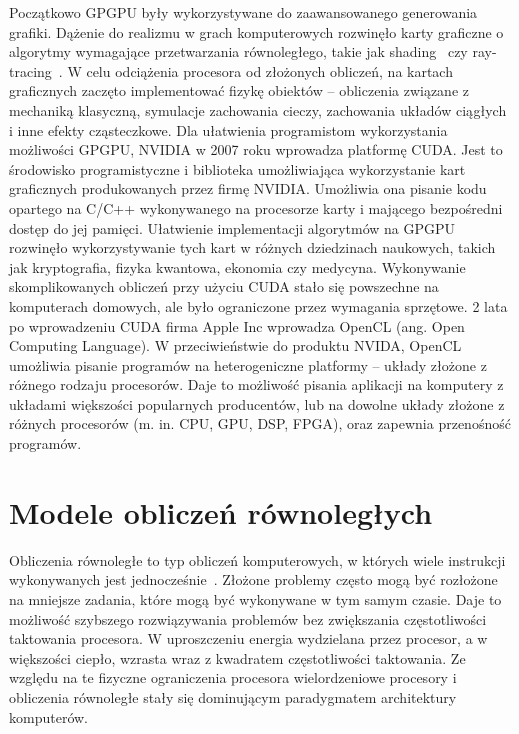 Początkowo GPGPU były wykorzystywane do zaawansowanego generowania grafiki. Dążenie do realizmu w grach komputerowych rozwinęło karty graficzne o algorytmy wymagające przetwarzania równoległego, takie jak shading~\cite{b18} czy ray-tracing~\cite{b3}. W celu odciążenia procesora od złożonych obliczeń, na kartach graficznych zaczęto implementować fizykę obiektów – obliczenia związane z mechaniką klasyczną, symulacje zachowania cieczy, zachowania układów ciągłych i inne efekty cząsteczkowe. Dla ułatwienia programistom wykorzystania możliwości GPGPU, NVIDIA w 2007 roku wprowadza platformę CUDA. Jest to środowisko programistyczne i biblioteka umożliwiająca wykorzystanie kart graficznych produkowanych przez firmę NVIDIA. Umożliwia ona pisanie kodu opartego na C/C++ wykonywanego na procesorze karty i mającego bezpośredni dostęp do jej pamięci. Ułatwienie implementacji algorytmów na GPGPU rozwinęło wykorzystywanie tych kart w różnych dziedzinach naukowych, takich jak kryptografia, fizyka kwantowa, ekonomia czy medycyna. Wykonywanie  skomplikowanych obliczeń przy użyciu CUDA stało się powszechne na komputerach domowych, ale było ograniczone przez wymagania sprzętowe. 2 lata po wprowadzeniu CUDA firma Apple Inc wprowadza OpenCL (ang. Open Computing Language). W przeciwieństwie do produktu NVIDA, OpenCL umożliwia pisanie programów na heterogeniczne platformy – układy złożone z różnego rodzaju procesorów. Daje to możliwość pisania aplikacji na komputery z układami większości popularnych producentów, lub  na dowolne układy złożone z różnych procesorów (m. in. CPU, GPU, DSP, FPGA), oraz zapewnia przenośność programów.


\section{Modele obliczeń równoległych}\label{sec:Paralellism}

Obliczenia równoległe to typ obliczeń komputerowych, w których wiele instrukcji wykonywanych jest jednocześnie~\cite{b14}. Złożone problemy często mogą być rozłożone na mniejsze zadania, które mogą być wykonywane w tym samym czasie. Daje to możliwość szybszego rozwiązywania problemów bez zwiększania częstotliwości taktowania procesora. W uproszczeniu energia wydzielana przez procesor, a w większości ciepło, wzrasta wraz z kwadratem częstotliwości taktowania. Ze względu na te fizyczne ograniczenia procesora wielordzeniowe procesory i obliczenia równoległe stały się dominującym paradygmatem architektury komputerów.

